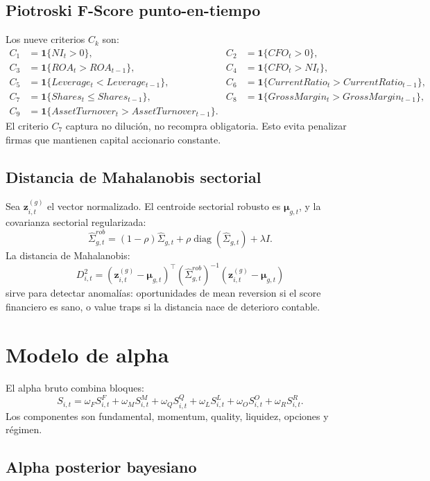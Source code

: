 \documentclass[11pt,letterpaper]{article}
\DeclareMathOperator{\diag}{diag}
\newcommand{\1}{\mathbf{1}}
\begin{document}
\subsection{Piotroski F-Score punto-en-tiempo}

Los nueve criterios \(C_k\) son:
\[
\begin{aligned}
C_1&=\1\{NI_t>0\},&
C_2&=\1\{CFO_t>0\},\\
C_3&=\1\{ROA_t>ROA_{t-1}\},&
C_4&=\1\{CFO_t>NI_t\},\\
C_5&=\1\{Leverage_t<Leverage_{t-1}\},&
C_6&=\1\{CurrentRatio_t>CurrentRatio_{t-1}\},\\
C_7&=\1\{Shares_t\le Shares_{t-1}\},&
C_8&=\1\{GrossMargin_t>GrossMargin_{t-1}\},\\
C_9&=\1\{AssetTurnover_t>AssetTurnover_{t-1}\}.
\end{aligned}
\]
El criterio \(C_7\) captura no dilución, no recompra obligatoria. Esto evita penalizar firmas que mantienen capital accionario constante.

\subsection{Distancia de Mahalanobis sectorial}

Sea \(\bm z_{i,t}^{(g)}\) el vector normalizado. El centroide sectorial robusto es \(\bm \mu_{g,t}\), y la covarianza sectorial regularizada:
\[
    \hat\Sigma_{g,t}^{rob}
    =
    (1-\rho)\hat\Sigma_{g,t}
    +
    \rho \diag(\hat\Sigma_{g,t})
    +
    \lambda I.
\]
La distancia de Mahalanobis:
\[
    D^2_{i,t}
    =
    (\bm z_{i,t}^{(g)}-\bm\mu_{g,t})^\top
    (\hat\Sigma_{g,t}^{rob})^{-1}
    (\bm z_{i,t}^{(g)}-\bm\mu_{g,t})
\]
sirve para detectar anomalías: oportunidades de mean reversion si el score financiero es sano, o value traps si la distancia nace de deterioro contable.

\newpage
\section{Modelo de alpha}

El alpha bruto combina bloques:
\[
    S_{i,t}
    =
    \omega_F S^F_{i,t}
    +
    \omega_M S^M_{i,t}
    +
    \omega_Q S^Q_{i,t}
    +
    \omega_L S^L_{i,t}
    +
    \omega_O S^O_{i,t}
    +
    \omega_R S^R_{i,t}.
\]
Los componentes son fundamental, momentum, quality, liquidez, opciones y régimen.

\subsection{Alpha posterior bayesiano}
\end{document}
